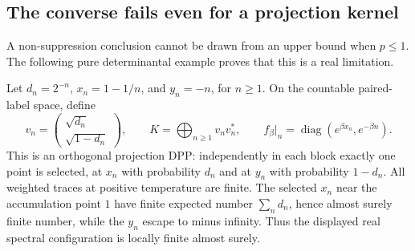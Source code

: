 \documentclass[11pt,a4paper]{article}
\theoremstyle{remark}\newtheorem{remark}[theorem]{Remark}
\begin{document}
\subsection{The converse fails even for a projection kernel}
A non-suppression conclusion cannot be drawn from an upper bound when $p\le1$.
The following pure determinantal example proves that this is a real limitation.

Let $d_n=2^{-n}$, $x_n=1-1/n$, and $y_n=-n$, for $n\ge1$.
On the countable paired-label space, define
\begin{equation}
 v_n=\begin{pmatrix}\sqrt{d_n}\\\sqrt{1-d_n}\end{pmatrix},\qquad
 K=\bigoplus_{n\ge1}v_nv_n^*,\qquad
 f_\beta|_n=\operatorname{diag}(e^{\beta x_n},e^{-\beta n}).
\end{equation}
This is an orthogonal projection DPP: independently in each block exactly one point is selected, at $x_n$ with probability $d_n$ and at $y_n$ with probability $1-d_n$.
All weighted traces at positive temperature are finite.
The selected $x_n$ near the accumulation point $1$ have finite expected number $\sum_n d_n$, hence almost surely finite number, while the $y_n$ escape to minus infinity.
Thus the displayed real spectral configuration is locally finite almost surely.
\end{document}
